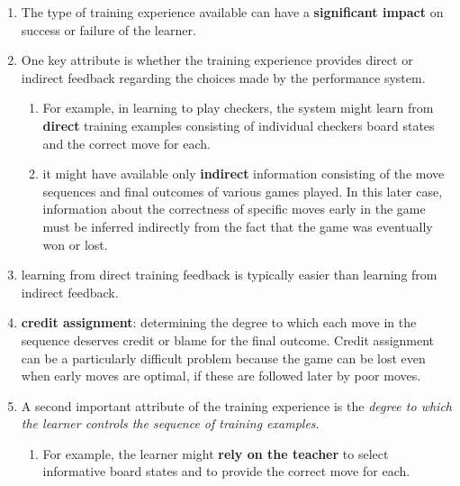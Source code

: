 \begin{enumerate}
    \item The type of training experience available can have a \textbf{significant impact} on success or failure of the learner.
    \hfill \cite{ml/book/Machine-Learning/Tom-M-Mitchell}

    \item One key attribute is whether the training experience provides direct or indirect feedback regarding the choices made by the performance system.
    \hfill \cite{ml/book/Machine-Learning/Tom-M-Mitchell}
    \begin{enumerate}
        \item For example, in learning to play checkers, the system might learn from \textbf{direct} training examples consisting of individual checkers board states and the correct move for each.
        \hfill \cite{ml/book/Machine-Learning/Tom-M-Mitchell}

        \item it might have available only \textbf{indirect} information consisting of the move sequences and final outcomes of various games played. In this later case, information about the correctness of specific moves early in the game must be inferred indirectly from the fact that the game was eventually won or lost.
        \hfill \cite{ml/book/Machine-Learning/Tom-M-Mitchell}
    \end{enumerate}

    \item learning from direct training feedback is typically easier than learning from indirect feedback.
    \hfill \cite{ml/book/Machine-Learning/Tom-M-Mitchell}

    \item \textbf{credit assignment}: determining the degree to which each move in the sequence deserves credit or blame for the final outcome. Credit assignment can be a particularly difficult problem because the game can be lost even when early moves are optimal, if these are followed later by poor moves.
    \hfill \cite{ml/book/Machine-Learning/Tom-M-Mitchell}

    \item A second important attribute of the training experience is the \textit{degree to which the learner controls the sequence of training examples}. 
    \begin{enumerate}
        \item For example, the learner might \textbf{rely on the teacher} to select informative board states and to provide the correct move for each. 
        \hfill \cite{ml/book/Machine-Learning/Tom-M-Mitchell}


\end{enumerate}
\end{enumerate}
